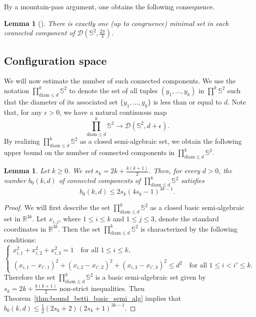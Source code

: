 \documentclass[12pt]{amsart}
\theoremstyle{plain}
\newtheorem{lemma}[theorem]{Lemma}
\newcommand{\R}{\mathbb{R}}
\newcommand{\Sp}{\mathbb{S}}
\newcommand{\diam}{\mathrm{diam}}
\numberwithin{equation}{section}
\begin{document}
By a mountain-pass argument, one obtains the following consequence.

\begin{lemma}
[{\cite[Corollary
      2]{katz1989diameter}}]
\label{lem:unique_minimal_in_connected_component}
There is exactly one (up to congruence) minimal set in each connected
component of $\mathcal D(\Sp^2, \frac{2\pi}{3})$.
\end{lemma}


\subsection{Configuration space}
\label{s31}

We will now estimate the number of such connected components.  We use
the notation $\prod\limits_{\diam \leq d}^k\Sp^2$ to denote the set of
all tuples $(y_1, \dots, y_k)$ in $\prod^k \Sp^2$ such that the
diameter of its associated set $\{y_1, \dots, y_k\}$ is less than or
equal to $d$.  Note that, for any $\epsilon>0$, we have a natural
continuous map
\[
	\prod\limits_{\diam \leq d}^k\Sp^2 \longrightarrow \mathcal
        D(\Sp^2, d + \epsilon).
\]
By realizing $\prod\limits_{\diam \leq d}^k\Sp^2$ as a closed
semi-algebraic set, we obtain the following upper bound on the number
of connected components in $\prod\limits_{\diam \leq d}^k\Sp^2$.


\begin{lemma}\label{lem:finiteness_of_connected_components}
Let $k\geq0$.  We set $s_k= 2k + \frac{k(k+1)}{2}$.  Then, for every
$d>0$, the number $b_0(k,d)$ of connected components of
$\prod\limits_{\diam \leq d}^k\Sp^2$ satisfies
$$ b_0(k,d)\leq 2s_k(4s_k-1)^{3k-1}.$$
\end{lemma}

\begin{proof}
	We will first describe the set $\prod\limits_{\diam \leq d}^k\Sp^2$ as a closed basic semi-algebraic set in $\R^{3k}$.
	Let $x_{i, j}$, where $1\leq i\leq k$ and $1\leq j\leq 3$, denote the standard coordinates in $\R^{3k}$. Then the set $\prod\limits_{\diam \leq d}^k\Sp^2$ is characterized by the following conditions:
	\begin{equation*}\label{eqn:semi_alg}
		\begin{cases}
			x_{i, 1}^2 + x_{i, 2}^2 + x_{i, 3}^2  =  1\quad\text{for all $1\leq i\leq k$,}\\
			(x_{i, 1} - x_{i', 1})^2 + (x_{i, 2} - x_{i', 2})^2 + (x_{i, 3} - x_{i', 3})^2 \leq d^2 \quad\text{for all $1\leq i< i'\leq k$.}
		\end{cases}
	\end{equation*}
Therefore the set $\prod\limits_{\diam \leq d}^k\Sp^2$ is a basic
semi-algebraic set given by $s_k =2k + \frac{k(k+1)}{2}$ non-strict
inequalities.  Then Theorem~\ref{thm:bound_betti_basic_semi_alg}
implies that $ b_0(k,d)\leq \frac{1}{2}(2s_k+2)(2s_k+1)^{3k-1}.$
\end{proof}
\end{document}

